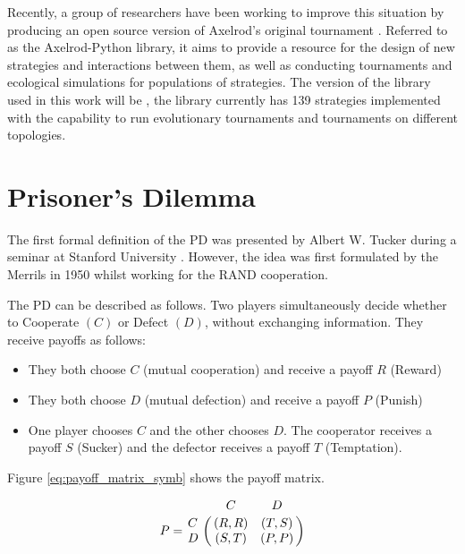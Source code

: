 Recently, a group of researchers have been working to improve this situation by producing an open source version of Axelrod's original tournament \cite{Knight2016}.
Referred to as the Axelrod-Python library, it aims to provide a resource for the design of new strategies and interactions between them, as well as conducting tournaments and ecological simulations for populations of strategies.
The version of the library used in this work will be \cite{axelrodproject}, the library currently has 139 strategies implemented with the capability to run evolutionary tournaments and tournaments on different topologies.

\section{Prisoner's Dilemma}\label{sec:intro_pd}
The first formal definition of the PD was presented by Albert W. Tucker during a seminar at Stanford University \cite{Gass2005}.
However, the idea was first formulated by the Merrils \cite{Flood1958} in 1950 whilst working for the RAND cooperation.

The PD can be described as follows. Two players simultaneously decide whether to
Cooperate $(C)$ or Defect $(D)$, without exchanging information.  They receive
payoffs as follows:

\begin{itemize}
    \item They both choose $C$ (mutual cooperation) and receive a payoff $R$ (Reward)
    \item They both choose $D$ (mutual defection) and receive a payoff $P$ (Punish)
    \item One player chooses $C$ and the other chooses $D$. The cooperator receives a payoff $S$ (Sucker) and the defector receives a payoff $T$ (Temptation).
\end{itemize}

Figure \ref{eq:payoff_matrix_symb} shows the payoff matrix.

\begin{equation}\label{eq:payoff_matrix_symb}
%
P = \bordermatrix{~ & C & D \cr
                  C & (R, R) & (T, S) \cr
                  D & (S, T) & (P, P) \cr}
%
\end{equation}

